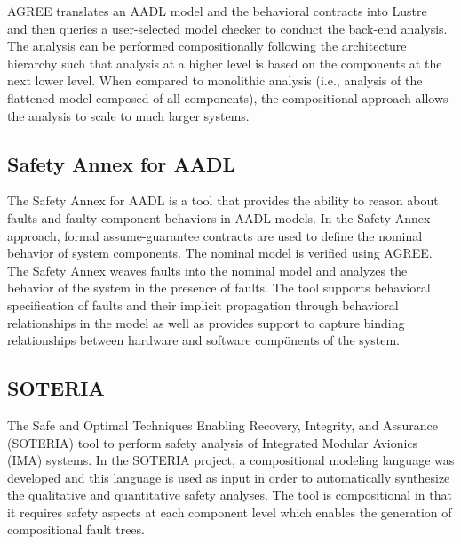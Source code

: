 AGREE translates an AADL model and the behavioral contracts into Lustre~\cite{Halbwachs91:IEEE} and then queries a user-selected
model checker to conduct the back-end analysis. The analysis can be performed compositionally following the architecture hierarchy such that analysis at a higher level is based on the components at the next lower level.  When compared to monolithic analysis (i.e., analysis of the flattened model composed of all components), the compositional approach allows the analysis to scale to much larger systems. 

\subsection{Safety Annex for AADL}
The Safety Annex for AADL \cite{Stewart17:IMBSA,SATechReport} is a tool that provides the ability to reason about faults and faulty component behaviors in AADL models. In the Safety Annex approach, formal assume-guarantee contracts are used to define the nominal behavior of system components. The nominal model is verified using AGREE. The Safety Annex weaves faults into the nominal model and analyzes the behavior of the system in the presence of faults. The tool supports behavioral specification of faults and their implicit propagation through behavioral relationships in the model as well as provides support to capture binding relationships between hardware and software compönents of the system. 

\subsection{SOTERIA}
The Safe and Optimal Techniques Enabling Recovery, Integrity, and Assurance (SOTERIA) tool \cite{SOTERIAproject} to perform safety analysis of Integrated Modular Avionics (IMA) systems. In the SOTERIA project, a compositional modeling language was developed and this language is used as input in order to automatically synthesize the qualitative and quantitative safety analyses. The tool is compositional in that it requires safety aspects at each component level which enables the generation of compositional fault trees. 

